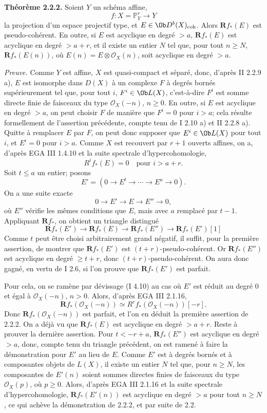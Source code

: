 \documentclass[11pt]{article}
\begin{document}
\textbf{Théorème 2.2.2.} Soient \(Y\) un schéma affine,
\[
  f:X=\mathbb P^r_Y\longrightarrow Y
\]
la projection d'un espace projectif type, et \(E\in\Ob D^b(X)_{\mathrm{coh}}\). Alors \(\mathbf Rf_*(E)\) est pseudo-cohérent. En outre, si \(E\) est acyclique en degré \(>a\), \(\mathbf Rf_*(E)\) est acyclique en degré \(>a+r\), et il existe un entier \(N\) tel que, pour tout \(n\geq N\), \(\mathbf Rf_*(E(n))\), où \(E(n)=E\otimes\mathcal O_X(n)\), soit acyclique en degré \(>a\).

\emph{Preuve.} Comme \(Y\) est affine, \(X\) est quasi-compact et séparé, donc, d'après II 2.2.9 a), \(E\) est isomorphe dans \(D(X)\) à un complexe \(F\) à degrés bornés supérieurement tel que, pour tout \(i\), \(F^i\in\Ob L(X)\), c'est-à-dire \(F^i\) est somme directe finie de faisceaux du type \(\mathcal O_X(-n)\), \(n\geq0\). En outre, si \(E\) est acyclique en degré \(>a\), on peut choisir \(F\) de manière que \(F^i=0\) pour \(i>a\); cela résulte formellement de l'assertion précédente, compte tenu de I 2.10 a) et II 2.2.8 a). Quitte à remplacer \(E\) par \(F\), on peut donc supposer que \(E^i\in\Ob L(X)\) pour tout \(i\), et \(E^i=0\) pour \(i>a\). Comme \(X\) est recouvert par \(r+1\) ouverts affines, on a, d'après EGA III 1.4.10 et la suite spectrale d'hypercohomologie,
\[
  R^if_*(E)=0\quad\text{pour }i>a+r.
\]
Soit \(t\leq a\) un entier; posons
\[
  E'=(0\to E^t\to\cdots\to E^a\to0).
\]
On a une suite exacte
\[
  0\longrightarrow E'\longrightarrow E\longrightarrow E''\longrightarrow0,
\]
où \(E''\) vérifie les mêmes conditions que \(E\), mais avec \(a\) remplacé par \(t-1\). Appliquant \(\mathbf Rf_*\), on obtient un triangle distingué
\[
\mathbf Rf_*(E')\longrightarrow \mathbf Rf_*(E)\longrightarrow \mathbf Rf_*(E'')\longrightarrow \mathbf Rf_*(E')[1]
\]
Comme \(t\) peut être choisi arbitrairement grand négatif, il suffit, pour la première assertion, de montrer que \(\mathbf Rf_*(E')\) est \((t+r)\)-pseudo-cohérent. Or \(\mathbf Rf_*(E'')\) est acyclique en degré \(\geq t+r\), donc \((t+r)\)-pseudo-cohérent. On aura donc gagné, en vertu de I 2.6, si l'on prouve que \(\mathbf Rf_*(E')\) est parfait.

Pour cela, on se ramène par dévissage (I 4.10) au cas où \(E'\) est réduit au degré \(0\) et égal à \(\mathcal O_X(-n)\), \(n>0\). Alors, d'après EGA III 2.1.16,
\[
  \mathbf Rf_*(\mathcal O_X(-n))\simeq R^rf_*(\mathcal O_X(-n))[-r].
\]
Donc \(\mathbf Rf_*(\mathcal O_X(-n))\) est parfait, et l'on en déduit la première assertion de 2.2.2. On a déjà vu que \(\mathbf Rf_*(E)\) est acyclique en degré \(>a+r\). Reste à prouver la dernière assertion. Pour \(t<-r+a\), \(\mathbf Rf_*(E'')\) est acyclique en degré \(>a\), donc, compte tenu du triangle précédent, on est ramené à faire la démonstration pour \(E'\) au lieu de \(E\). Comme \(E'\) est à degrés bornés et à composantes objets de \(L(X)\), il existe un entier \(N\) tel que, pour \(n\geq N\), les composantes de \(E'(n)\) soient sommes directes finies de faisceaux du type \(\mathcal O_X(p)\), où \(p\geq0\). Alors, d'après EGA III 2.1.16 et la suite spectrale d'hypercohomologie, \(\mathbf Rf_*(E'(n))\) est acyclique en degré \(>a\) pour tout \(n\geq N\), ce qui achève la démonstration de 2.2.2, et par suite de 2.2.
\end{document}

